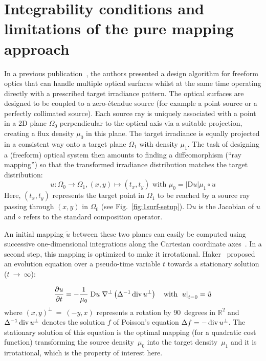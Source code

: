 
\section{Integrability conditions and limitations of the pure mapping approach}

In a previous publication~\cite{Baeuerle2012}, the authors
presented a design algorithm for freeform optics that can handle
multiple optical surfaces whilst at the same time operating directly
with a prescribed target irradiance pattern.  The optical surfaces are
designed to be coupled to a zero-\'{e}tendue source (for example a point
source or a perfectly collimated source). Each source ray is uniquely
associated with a point in a 2D plane $\Omega_0$ perpendicular to the
optical axis via a suitable projection, creating a flux density
$\mu_0$ in this plane. The target irradiance is equally projected in a
consistent way onto a target plane $\Omega_1$ with density
$\mu_1$. The task of designing a (freeform) optical system then
amounts to finding a diffeomorphism (``ray mapping'') so that the
transformed irradiance distribution matches the target distribution:
\begin{equation}
  u:\Omega_0\to\Omega_1, (x,y)\mapsto(t_x,t_y)\text{~with~}\mu_0=|\mathrm{D}u|\mu_1\circ u
\end{equation}
Here, $(t_x,t_y)$ represents the target point in $\Omega_1$ to be
reached by a source ray passing through $(x,y)$ in $\Omega_0$ (see
Fig.~\ref{fig:1surf-setup}). $\mathrm{D}u$ is the Jacobian of $u$ and
$\circ$ refers to the standard composition operator.

An initial mapping $\tilde{u}$ between these two planes can easily be
computed using successive one-dimensional integrations along the
Cartesian coordinate axes~\cite{Parkyn1998}. In a second step, this
mapping is optimized to make it irrotational. Haker~\cite{Haker2004}
proposed an evolution equation over a pseudo-time variable $t$ towards
a stationary solution ($t~\to~\infty$):

\begin{equation}
  \frac{\partial{u}}{\partial{t}} = -\frac{1}{\mu_0} \; {\rm D} u\; \nabla^\bot \left( \Delta^{-1}\operatorname{div}  u^\bot \right)\text{\quad with } \left.u\right|_{t=0}=\tilde{u}
  \label{eq:haker-ev}
\end{equation}
where $(x,y)^\bot~=~(-y,x)$ represents a rotation by 90~degrees in
$\mathbb{R}^2$ and $\Delta^{-1}\operatorname{div} u^\bot$ denotes the solution $f$
of Poisson's equation $ \Delta f = -\operatorname{div} u^\bot $.  The stationary
solution of this equation is the optimal mapping (for a quadratic cost
function) transforming the source density~$\mu_0$ into the target
density~$\mu_1$ and it is irrotational, which is the property of
interest here.

